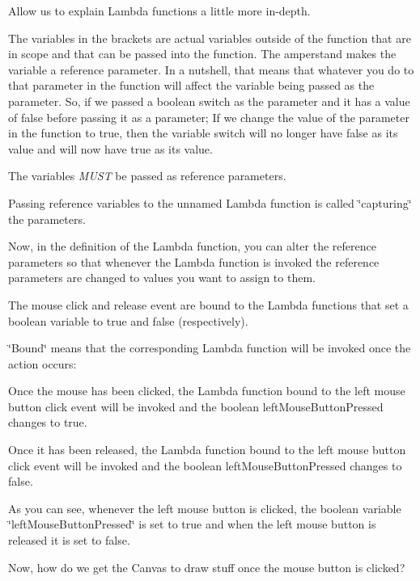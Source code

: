 Allow us to explain Lambda functions a little more in-\/depth.

The variables in the brackets are actual variables outside of the function that are in scope and that can be passed into the function. The amperstand makes the variable a reference parameter. In a nutshell, that means that whatever you do to that parameter in the function will affect the variable being passed as the parameter. So, if we passed a boolean {\ttfamily switch} as the parameter and it has a value of {\ttfamily false} before passing it as a parameter; If we change the value of the parameter in the function to {\ttfamily true}, then the variable {\ttfamily switch} will no longer have {\ttfamily false} as its value and will now have {\ttfamily true} as its value.

The variables {\itshape M\+U\+S\+T} be passed as reference parameters.

Passing reference variables to the unnamed Lambda function is called \char`\"{}capturing\char`\"{} the parameters.

Now, in the definition of the Lambda function, you can alter the reference parameters so that whenever the Lambda function is invoked the reference parameters are changed to values you want to assign to them.

The mouse click and release event are bound to the Lambda functions that set a boolean variable to true and false (respectively).

\char`\"{}\+Bound\char`\"{} means that the corresponding Lambda function will be invoked once the action occurs\+:


\begin{DoxyItemize}
\item Once the mouse has been clicked, the Lambda function bound to the left mouse button click event will be invoked and the boolean {\ttfamily left\+Mouse\+Button\+Pressed} changes to true.
\item Once it has been released, the Lambda function bound to the left mouse button click event will be invoked and the boolean {\ttfamily left\+Mouse\+Button\+Pressed} changes to false.
\end{DoxyItemize}

As you can see, whenever the left mouse button is clicked, the boolean variable \char`\"{}left\+Mouse\+Button\+Pressed\char`\"{} is set to true and when the left mouse button is released it is set to false.

Now, how do we get the Canvas to draw stuff once the mouse button is clicked?

